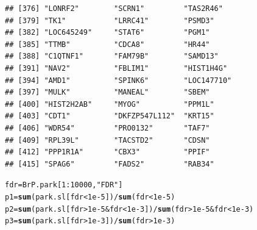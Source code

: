 \documentclass{article}\usepackage[]{graphicx}\usepackage[]{color}
\makeatletter
\newcommand{\hlnum}[1]{\textcolor[rgb]{0.686,0.059,0.569}{#1}}%
\newcommand{\hlstr}[1]{\textcolor[rgb]{0.192,0.494,0.8}{#1}}%
\newcommand{\hlopt}[1]{\textcolor[rgb]{0,0,0}{#1}}%
\newcommand{\hlstd}[1]{\textcolor[rgb]{0.345,0.345,0.345}{#1}}%
\newcommand{\hlkwb}[1]{\textcolor[rgb]{0.69,0.353,0.396}{#1}}%
\newcommand{\hlkwd}[1]{\textcolor[rgb]{0.737,0.353,0.396}{\textbf{#1}}}%
\newenvironment{kframe}{%
 \def\at@end@of@kframe{}%
 \ifinner\ifhmode%
  \def\at@end@of@kframe{\end{minipage}}%
  \begin{minipage}{\columnwidth}%
 \fi\fi%
 \def\FrameCommand##1{\hskip\@totalleftmargin \hskip-\fboxsep
 \colorbox{shadecolor}{##1}\hskip-\fboxsep
     \hskip-\linewidth \hskip-\@totalleftmargin \hskip\columnwidth}%
 \MakeFramed {\advance\hsize-\width
   \@totalleftmargin\z@ \linewidth\hsize
   \@setminipage}}%
 {\par\unskip\endMakeFramed%
 \at@end@of@kframe}
\newenvironment{knitrout}{}{} %
\makeatother
\begin{document}
\begin{knitrout}
\begin{kframe}
\begin{verbatim}
## [376] "LONRF2"        "SCRN1"         "TAS2R46"      
## [379] "TK1"           "LRRC41"        "PSMD3"        
## [382] "LOC645249"     "STAT6"         "PGM1"         
## [385] "TTMB"          "CDCA8"         "HR44"         
## [388] "C1QTNF1"       "FAM79B"        "SAMD13"       
## [391] "NAV2"          "FBLIM1"        "HIST1H4G"     
## [394] "AMD1"          "SPINK6"        "LOC147710"    
## [397] "MULK"          "MANEAL"        "SBEM"         
## [400] "HIST2H2AB"     "MYOG"          "PPM1L"        
## [403] "CDT1"          "DKFZP547L112"  "KRT15"        
## [406] "WDR54"         "PRO0132"       "TAF7"         
## [409] "RPL39L"        "TACSTD2"       "CDSN"         
## [412] "PPP1R1A"       "CBX3"          "PPIF"         
## [415] "SPAG6"         "FADS2"         "RAB34"
\end{verbatim}
\begin{alltt}
\hlstd{fdr}\hlkwb{=}\hlstd{BrP.park[}\hlnum{1}\hlopt{:}\hlnum{10000}\hlstd{,}\hlstr{"FDR"}\hlstd{]}
\hlstd{p1}\hlkwb{=}\hlkwd{sum}\hlstd{(park.sl[fdr}\hlopt{<}\hlnum{1e-5}\hlstd{])}\hlopt{/}\hlkwd{sum}\hlstd{(fdr}\hlopt{<}\hlnum{1e-5}\hlstd{)}
\hlstd{p2}\hlkwb{=}\hlkwd{sum}\hlstd{(park.sl[fdr}\hlopt{>}\hlnum{1e-5} \hlopt{&} \hlstd{fdr}\hlopt{<}\hlnum{1e-3}\hlstd{])}\hlopt{/}\hlkwd{sum}\hlstd{(fdr}\hlopt{>}\hlnum{1e-5} \hlopt{&} \hlstd{fdr}\hlopt{<}\hlnum{1e-3}\hlstd{)}
\hlstd{p3}\hlkwb{=}\hlkwd{sum}\hlstd{(park.sl[fdr}\hlopt{>}\hlnum{1e-3}\hlstd{])}\hlopt{/}\hlkwd{sum}\hlstd{(fdr}\hlopt{>}\hlnum{1e-3}\hlstd{)}


\end{alltt}
\end{kframe}
\end{knitrout}
\end{document}
